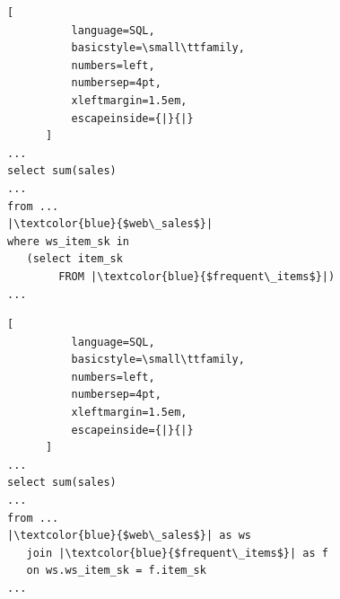 \begin{listing}[h]
  \centering
  \begin{minipage}[t]{0.48\linewidth} 
    \begin{framed}
      \vspace{-3mm} %
      \begin{lstlisting}[
          language=SQL,
          basicstyle=\small\ttfamily,
          numbers=left,
          numbersep=4pt,
          xleftmargin=1.5em,
          escapeinside={|}{|}
      ]
...
select sum(sales)
...
from ...
|\textcolor{blue}{$web\_sales$}| 
where ws_item_sk in
   (select item_sk
        FROM |\textcolor{blue}{$frequent\_items$}|)
...
      \end{lstlisting}
      \vspace{-3mm}
    \end{framed}
    \vspace{-1mm}
    \caption*{(a) TPC-DS Q11 Original}
  \end{minipage}
  \hfill
  \begin{minipage}[t]{0.48\linewidth}
    \begin{framed}
      \vspace{-3mm}
      \begin{lstlisting}[
          language=SQL,
          basicstyle=\small\ttfamily,
          numbers=left,
          numbersep=4pt,
          xleftmargin=1.5em,
          escapeinside={|}{|}
      ]
...
select sum(sales)
...
from ...
|\textcolor{blue}{$web\_sales$}| as ws
   join |\textcolor{blue}{$frequent\_items$}| as f 
   on ws.ws_item_sk = f.item_sk
...
      \end{lstlisting}
      \vspace{-3mm}
    \end{framed}
    \vspace{-1mm}
    \caption*{(b) TPC-DS Q11 Rewritten}
  \end{minipage}

  \vspace{-1mm}
  \captionsetup{font=small,name=Listing}
  \caption{Left: Original TPC-DS Q23 query. Right: A rewrite of Q23 generated by \baseline that is inequivalent.}
  \label{gen:listing:inequivalent_nlr2}
\end{listing}






